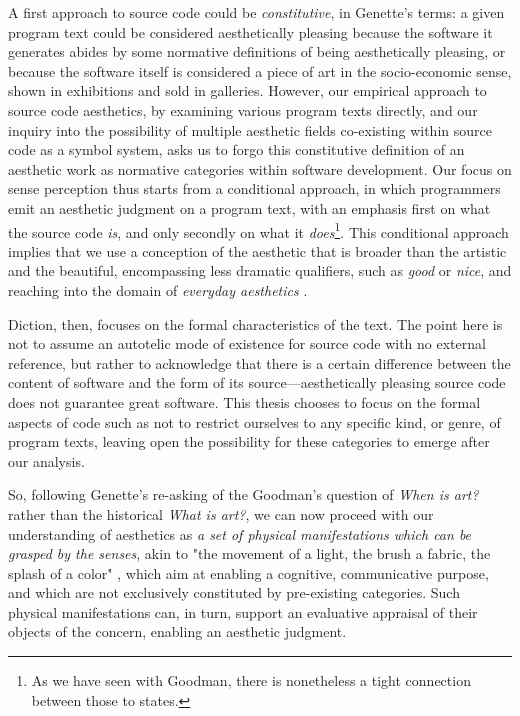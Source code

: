 A first approach to source code could be \emph{constitutive}, in Genette's terms: a given program text could be considered aesthetically pleasing because the software it generates abides by some normative definitions of being aesthetically pleasing, or because the software itself is considered a piece of art in the socio-economic sense, shown in exhibitions and sold in galleries. However, our empirical approach to source code aesthetics, by examining various program texts directly, and our inquiry into the possibility of multiple aesthetic fields co-existing within source code as a symbol system, asks us to forgo this constitutive definition of an aesthetic work as normative categories within software development. Our focus on sense perception thus starts from a conditional approach, in which programmers emit an aesthetic judgment on a program text, with an emphasis first on what the source code \emph{is}, and only secondly on what it \emph{does}\footnote{As we have seen with Goodman, there is nonetheless a tight connection between those to states.}. This conditional approach implies that we use a conception of the aesthetic that is broader than the artistic and the beautiful, encompassing less dramatic qualifiers, such as \emph{good} or \emph{nice}, and reaching into the domain of \emph{everyday aesthetics} \citep{saito_everyday_2012}.

Diction, then, focuses on the formal characteristics of the text. The point here is not to assume an autotelic mode of existence for source code with no external reference, but rather to acknowledge that there is a certain difference between the content of software and the form of its source—aesthetically pleasing source code does not guarantee great software. This thesis chooses to focus on the formal aspects of code such as not to restrict ourselves to any specific kind, or genre, of program texts, leaving open the possibility for these categories to emerge after our analysis.

So, following Genette's re-asking of the Goodman's question of \emph{When is art?} rather than the historical \emph{What is art?}, we can now proceed with our understanding of aesthetics as \emph{a set of physical manifestations which can be grasped by the senses}, akin to "the movement of a light, the brush a fabric, the splash of a color" \citep{ranciere_aisthesis_2013}, which aim at enabling a cognitive, communicative purpose, and which are not exclusively constituted by pre-existing categories. Such physical manifestations can, in turn, support an evaluative appraisal of their objects of the concern, enabling an aesthetic judgment.

